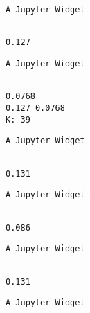 \documentclass[11pt]{article}
\begin{document}
    
    \begin{verbatim}
A Jupyter Widget
    \end{verbatim}

    
    \begin{Verbatim}[commandchars=\\\{\}]

0.127

    \end{Verbatim}

    
    \begin{verbatim}
A Jupyter Widget
    \end{verbatim}

    
    \begin{Verbatim}[commandchars=\\\{\}]

0.0768
0.127 0.0768
K: 39

    \end{Verbatim}

    
    \begin{verbatim}
A Jupyter Widget
    \end{verbatim}

    
    \begin{Verbatim}[commandchars=\\\{\}]

0.131

    \end{Verbatim}

    
    \begin{verbatim}
A Jupyter Widget
    \end{verbatim}

    
    \begin{Verbatim}[commandchars=\\\{\}]

0.086

    \end{Verbatim}

    
    \begin{verbatim}
A Jupyter Widget
    \end{verbatim}

    
    \begin{Verbatim}[commandchars=\\\{\}]

0.131

    \end{Verbatim}

    
    \begin{verbatim}
A Jupyter Widget
    \end{verbatim}
\end{document}
